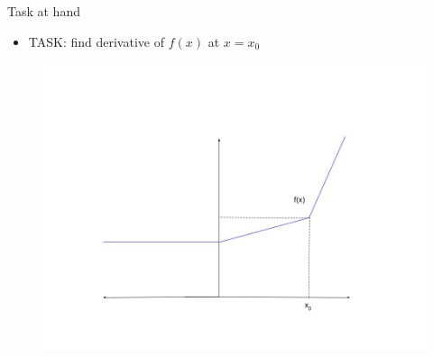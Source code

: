 \documentclass{beamer}
\begin{document}
\begin{frame}{Task at hand}
\begin{itemize}

\item TASK: find derivative of $f(x)$ at $x = x_0$
\end{itemize}
\begin{figure}
\centering
\includegraphics[scale = 0.25]{../assets/lasso-regression/diagrams/subgradient_1.jpg}

\label{fig:Non-differentiable function}
\end{figure}


\end{frame}
\end{document}
